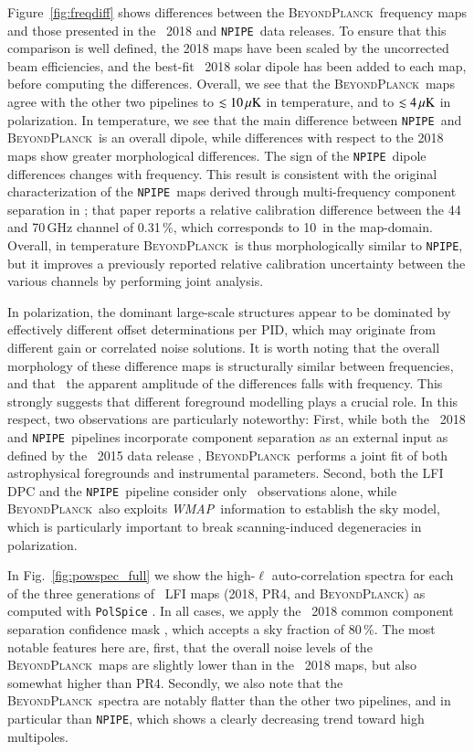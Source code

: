 \documentclass[onecolumn]{aa}
\def\WMAP{\emph{WMAP}}
\newcommand{\BP}{\textsc{BeyondPlanck}}
\newcommand{\npipe}[0]{\texttt{NPIPE}}
\begin{document}
Figure~\ref{fig:freqdiff} shows differences between the \BP\ frequency
maps and those presented in the \Planck\ 2018 and \npipe\ data
releases. To ensure that this comparison is well defined, the 2018
maps have been scaled by the uncorrected beam efficiencies, and the
best-fit \Planck\ 2018 solar dipole has been added to each map, before
computing the differences. Overall, we see that the \BP\ maps agree
with the other two pipelines to $\lesssim 10\muK$ in temperature, and
to $\lesssim 4\muK$ in polarization. In temperature, we see that the
main difference between \npipe\ and \BP\ is an overall dipole, while
differences with respect to the 2018 maps show greater morphological
differences. The sign of the \npipe\ dipole differences changes with
frequency. This result is consistent with the original
characterization of the \npipe\ maps derived through multi-frequency
component separation in \citet{planck2020-LVII}; that paper reports a relative
calibration difference between the 44 and 70\,GHz channel of 0.31\,\%,
which corresponds to 10\muK\ in the map-domain. Overall, in temperature
\BP\ is thus morphologically similar to \npipe, but it improves a
previously reported relative calibration uncertainty between the
various channels by performing joint analysis.

In polarization, the dominant large-scale structures appear to be
dominated by effectively different offset determinations per PID,
which may originate from different gain or correlated noise
solutions. It is worth noting that the overall morphology of these
difference maps is structurally similar between frequencies, and that
\ the apparent amplitude of the differences falls with frequency. This
strongly suggests that different foreground modelling plays a crucial
role. In this respect, two observations are particularly noteworthy:
First, while both the \Planck\ 2018 and \npipe\ pipelines incorporate
component separation as an external input as defined by the
\Planck\ 2015 data release \citep{planck2014-a12}, \BP\ performs a
joint fit of both astrophysical foregrounds and instrumental
parameters. Second, both the LFI DPC and the \npipe\ pipeline consider
only \Planck\ observations alone, while \BP\ also exploits
\WMAP\ information to establish the sky model, which is particularly
important to break scanning-induced degeneracies in polarization.

In Fig.~\ref{fig:powspec_full} we show the high-$\ell$
auto-correlation spectra for each of the three generations of
\Planck\ LFI maps (2018, PR4, and \BP) as computed with
\texttt{PolSpice} \citep{chon2004}. In all cases, we apply the
\Planck\ 2018 common component separation confidence mask
\citep{planck2016-l04}, which accepts a sky fraction of 80\,\%.  The
most notable features here are, first, that the overall noise levels
of the \BP\ maps are slightly lower than in the \Planck\ 2018 maps,
but also somewhat higher than PR4. Secondly, we also note that the
\BP\ spectra are notably flatter than the other two pipelines, and in
particular than \npipe, which shows a clearly decreasing trend toward
high multipoles.
\end{document}
